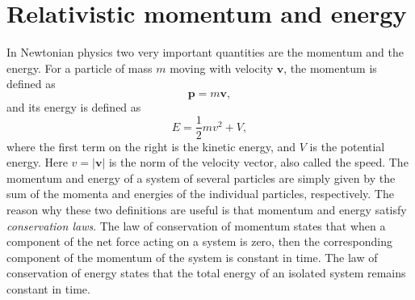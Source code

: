 \section{Relativistic momentum and energy}

In Newtonian physics two very important quantities are the momentum and the energy. For a particle of mass $m$ moving with velocity $\mathbf{v}$, the momentum is defined as
\begin{equation}
\mathbf{p}=m\mathbf{v}, 
\end{equation}
and its energy is defined as
\begin{equation}
E=\frac{1}{2}mv^2+V,
\end{equation}
where the first term on the right is the kinetic energy, and $V$ is the potential energy. Here $v=|\mathbf{v}|$ is the norm of the velocity vector, also called the speed. The momentum and energy of a system of several particles are simply given by the sum of the momenta and energies of the individual particles, respectively. The reason why these two definitions are useful is that momentum and energy satisfy {\it conservation laws}. The law of conservation of momentum states that when a component of the net force acting on a system is zero, then the corresponding component of the momentum of the system is constant in time. The law of conservation of energy states that the total energy of an isolated system remains constant in time.

